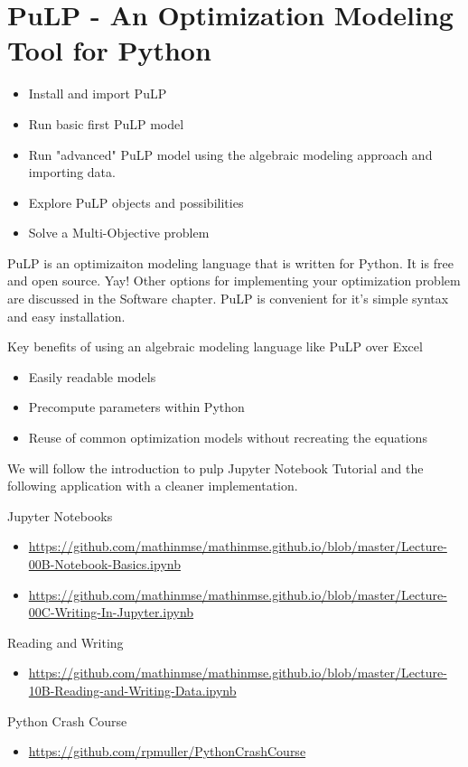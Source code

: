 \section{PuLP - An Optimization Modeling Tool for Python}
\begin{outcome}
\begin{itemize}
\item Install and import PuLP
\item Run basic first PuLP model
\item Run "advanced" PuLP model using the algebraic modeling approach and importing data.
\item Explore PuLP objects and possibilities
\item Solve a Multi-Objective problem
\end{itemize}
\end{outcome}

PuLP is an optimizaiton modeling language that is written for Python.  It is free and open source.  Yay!   Other options for implementing your optimization problem are discussed in the Software chapter.
PuLP is convenient for it's simple syntax and easy installation.   
 
Key benefits of using an algebraic modeling language like PuLP over Excel
\begin{itemize}
\item Easily readable models
\item Precompute parameters within Python
\item Reuse of common optimization models without recreating the equations
\end{itemize}

We will follow the introduction to pulp Jupyter Notebook Tutorial and the following application with a cleaner implementation.






\begin{resource}
Jupyter Notebooks
\begin{itemize}
\item \url{https://github.com/mathinmse/mathinmse.github.io/blob/master/Lecture-00B-Notebook-Basics.ipynb}
\item \url{https://github.com/mathinmse/mathinmse.github.io/blob/master/Lecture-00C-Writing-In-Jupyter.ipynb}
\end{itemize}
Reading and Writing
\begin{itemize}
\item \url{https://github.com/mathinmse/mathinmse.github.io/blob/master/Lecture-10B-Reading-and-Writing-Data.ipynb}
\end{itemize}
Python Crash Course
\begin{itemize}
\item \url{https://github.com/rpmuller/PythonCrashCourse}
\end{itemize}
\end{resource}

